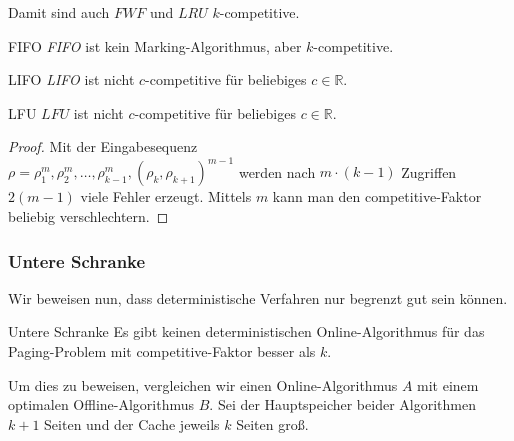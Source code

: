 \documentclass{panikzettel}
\begin{document}
Damit sind auch $FWF$ und $LRU$ $k$-competitive.

\begin{halfboxl}
\vspace{-\baselineskip}
    \begin{theo}{FIFO}
        \textit{FIFO} ist kein Marking-Algorithmus, aber $k$-competitive.
    \end{theo}
\end{halfboxl}%
\begin{halfboxr}
\vspace{-\baselineskip}
    \begin{theo}{LIFO}
        \textit{LIFO} ist nicht $c$-competitive für beliebiges $c \in \mathbb{R}$.
    \end{theo}
\end{halfboxr}

\begin{halfboxl}
\vspace{-\baselineskip}
    \begin{theo}{LFU}
        $LFU$ ist nicht $c$-competitive für beliebiges $c \in \mathbb{R}$.
    \end{theo}
\end{halfboxl}%
\begin{halfboxr}
    \vspace{-\baselineskip}
    \begin{proof}
    Mit der Eingabesequenz \\$\rho=\rho_1^{m},\rho_2^{m},\dots,\rho_{k-1}^{m},(\rho_k,\rho_{k+1})^{m-1}$ werden nach $m \cdot (k-1)$ Zugriffen $2(m-1)$ viele Fehler erzeugt. Mittels $m$ kann man den competitive-Faktor beliebig verschlechtern.
    \end{proof}
\end{halfboxr}

\subsubsection{Untere Schranke}
Wir beweisen nun, dass deterministische Verfahren nur begrenzt gut sein können.

\begin{theo}{Untere Schranke}
    Es gibt keinen deterministischen Online-Algorithmus für das Paging-Problem mit competitive-Faktor besser als $k$.
\end{theo}

Um dies zu beweisen, vergleichen wir einen Online-Algorithmus $A$ mit einem optimalen Offline-Algorithmus $B$. Sei der Hauptspeicher beider Algorithmen $k+1$ Seiten und der Cache jeweils $k$ Seiten groß.
\end{document}
